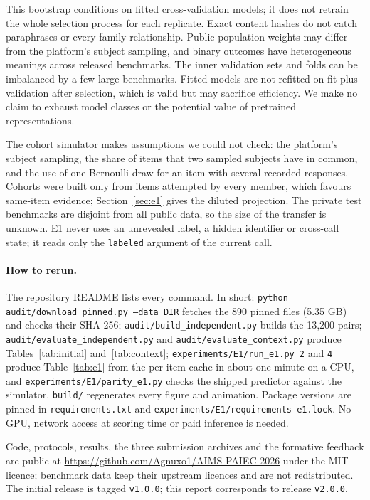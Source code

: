 \documentclass{article}
\begin{document}
This bootstrap conditions on fitted cross-validation models; it does not
retrain the whole selection process for each replicate. Exact content hashes
do not catch paraphrases or every family relationship. Public-population
weights may differ from the platform's subject sampling, and binary outcomes
have heterogeneous meanings across released benchmarks. The inner validation
sets and folds can be imbalanced by a few large benchmarks. Fitted models
are not refitted on fit plus validation after selection, which is valid but
may sacrifice efficiency. We make no claim to exhaust model classes or
the potential value of pretrained representations.

The cohort simulator makes assumptions we could not check: the platform's
subject sampling, the share of items that two sampled subjects have in common,
and the use of one Bernoulli draw for an item with several recorded responses.
Cohorts were built only from items attempted by every member, which favours
same-item evidence; Section~\ref{sec:e1} gives the diluted projection. The
private test benchmarks are disjoint from all public data, so the size of the
transfer is unknown. E1 never uses an unrevealed label, a hidden identifier or
cross-call state; it reads only the \texttt{labeled} argument of the current call.

\paragraph{How to rerun.} The repository README lists every command. In short:
\texttt{python audit/download\_pinned.py --data DIR} fetches the 890 pinned files
(5.35 GB) and checks their SHA-256; \texttt{audit/build\_independent.py} builds
the 13,200 pairs; \texttt{audit/evaluate\_independent.py} and
\texttt{audit/evaluate\_context.py} produce Tables~\ref{tab:initial}
and~\ref{tab:context}; \texttt{experiments/E1/run\_e1.py 2} and \texttt{4}
produce Table~\ref{tab:e1} from the per-item cache in about one minute on a CPU,
and \texttt{experiments/E1/parity\_e1.py} checks the shipped predictor against
the simulator. \texttt{build/} regenerates every figure and animation. Package
versions are pinned in \texttt{requirements.txt} and
\texttt{experiments/E1/requirements-e1.lock}. No GPU, network access at scoring
time or paid inference is needed.

Code, protocols, results, the three submission archives and the formative
feedback are public at \url{https://github.com/Agnuxo1/AIMS-PAIEC-2026} under
the MIT licence; benchmark data keep their upstream licences and are not
redistributed. The initial release is tagged \texttt{v1.0.0}; this report
corresponds to release \texttt{v2.0.0}.
\end{document}
